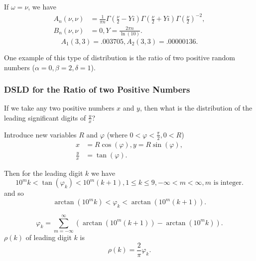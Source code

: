\documentclass[titlepage,fleqn]{article}%
\begin{document}
\begin{itemize}
If $\omega=\nu$, we have%
\begin{align*}
A_{n}(\nu,\nu)  &  =\frac{1}{\pi n}\Gamma\left(  \frac{\nu}{2}-Yi\right)
\Gamma\left(  \frac{\nu}{2}+Yi\right)  \Gamma\left(  \frac{\nu}{2}\right)
^{-2},\\
B_{n}(\nu,\nu)  &  =0,Y=\frac{2\pi n}{\ln(10)}.
\end{align*}%
\begin{equation}
A_{1}(3,3)=.003705,A_{2}(3,3)=.00000136.
\end{equation}

\end{itemize}

One example of this type of distribution is the ratio of two positive random
numbers ($\alpha=0,\beta=2,\delta=1$).

\subsubsection{DSLD for the Ratio of two Positive Numbers}%

\label{DofLD2P}%


If we take any two positive numbers $x$ and $y$, then what is the distribution
of the leading significant digits of $\frac{y}{x}$?

Introduce new variables $R$ and $\varphi$ (where $0<\varphi<\frac{\pi}{2}%
,0<R$)
\begin{align*}
x  &  =R\cos(\varphi),y=R\sin(\varphi),\\
\frac{y}{x}  &  =\tan(\varphi).
\end{align*}


Then for the leading digit $k$ we have%
\[
10^{m}k<\tan(\varphi_{k})<10^{m}(k+1),1\leq k\leq9,-\infty<m<\infty,m\text{ is
integer.}%
\]
and so%
\[
\arctan(10^{m}k)<\varphi_{k}<\arctan(10^{m}(k+1)).
\]
%

\begin{equation}
\varphi_{k}=%
{\displaystyle\sum\limits_{m=-\infty}^{\infty}}
\left(  \arctan(10^{m}(k+1))-\arctan(10^{m}k)\right)  . \label{Prob0}%
\end{equation}
$\rho(k)$ of leading digit $k$ is%
\begin{equation}
\rho(k)=\frac{2}{\pi}\varphi_{k}. \label{Prob1}%
\end{equation}
%
\end{document}

